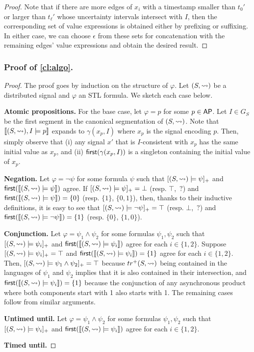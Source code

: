 \begin{proof}
	Note that if there are more edges of $x_i$ with a timestamp smaller than $t_0'$ or larger than $t_\ell'$ whose uncertainty intervals intersect with $I$, then the corresponding set of value expressions is obtained either by prefixing or suffixing.
	In either case, we can choose $\epsilon$ from these sets for concatenation with the remaining edges' value expressions and obtain the desired result.
\end{proof}

\subsubsection{Proof of \cref{cl:algo}.}
\begin{proof}
	The proof goes by induction on the structure of $\varphi$.
	Let $(S,{\rightsquigarrow})$ be a distributed signal and $\varphi$ an STL formula.
	We sketch each case below.
	
	\noindent\textbf{Atomic propositions.}
	For the base case, let $\varphi = p$ for some $p \in \mathsf{AP}$.
	Let $I \in G_S$ be the first segment in the canonical segmentation of $(S,{\rightsquigarrow})$.
	Note that $\llbracket (S, {\rightsquigarrow}), I \models p \rrbracket$ expands to $\gamma(x_p, I)$ where $x_p$ is the signal encoding $p$.
	Then, simply observe that (i) any signal $x'$ that is $I$-consistent with $x_p$ has the same initial value as $x_p$, and (ii) $\textsf{first}(\gamma(x_p, I))$ is a singleton containing the initial value of $x_p$.
 	
	\noindent\textbf{Negation.}
	Let $\varphi = \lnot \psi$ for some formula $\psi$ such that $[(S,{\rightsquigarrow}) \models \psi]_+$ and $\textsf{first}(\llbracket (S, {\rightsquigarrow}) \models \psi \rrbracket)$ agree.
	If $[(S,{\rightsquigarrow}) \models \psi]_+ = \bot$ (resp. $\top$, $\,?$) and $\textsf{first}(\llbracket (S, {\rightsquigarrow}) \models \psi \rrbracket) = \{0\}$ (resp. $\{1\}$, $\{0,1\}$), then, thanks to their inductive definitions, it is easy to see that $[(S,{\rightsquigarrow}) \models \lnot \psi]_+ = \top$ (resp. $\bot$, $\,?$) and $\textsf{first}(\llbracket (S, {\rightsquigarrow}) \models \lnot \psi \rrbracket) = \{1\}$ (resp. $\{0\}$, $\{1,0\}$).
		
	\noindent\textbf{Conjunction.}
	Let $\varphi = \psi_1 \land \psi_2$ for some formulas $\psi_1, \psi_2$ such that $[(S,{\rightsquigarrow}) \models \psi_i]_+$ and $\textsf{first}(\llbracket (S, {\rightsquigarrow}) \models \psi_i \rrbracket)$ agree for each $i \in \{1,2\}$.
	Suppose $[(S,{\rightsquigarrow}) \models \psi_i]_+ = \top$ and $\textsf{first}(\llbracket (S, {\rightsquigarrow}) \models \psi_i \rrbracket) = \{1\}$ agree for each $i \in \{1,2\}$.
	Then,  $[(S,{\rightsquigarrow}) \models \psi_1 \land \psi_2]_+ = \top$ because $tr^+(S,{\rightsquigarrow})$ being contained in the languages of $\psi_1$ and $\psi_2$ implies that it is also contained in their intersection, and $\textsf{first}(\llbracket (S, {\rightsquigarrow}) \models \psi_i \rrbracket) = \{1\}$ because the conjunction of any asynchronous product where both components start with 1 also starts with 1.
	The remaining cases follow from similar arguments.
		
	\noindent\textbf{Untimed until.}
	Let $\varphi = \psi_1 \land \psi_2$ for some formulas $\psi_1, \psi_2$ such that $[(S,{\rightsquigarrow}) \models \psi_i]_+$ and $\textsf{first}(\llbracket (S, {\rightsquigarrow}) \models \psi_i \rrbracket)$ agree for each $i \in \{1,2\}$.
	
	
	
	\noindent\textbf{Timed until.}
	\TODO
\end{proof}